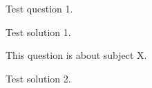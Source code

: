 \documentclass[online]{uob-cs-exam} %
\begin{document}
\maketitle

  \begin{questions}

    \question[10] Test question 1.
    \droppoints


    \begin{solution}
      Test solution 1.
    \end{solution}

    \question[10]
      This question is about subject X.

    \begin{solution}
      Test solution 2.
    \end{solution}

  \end{questions}
\end{document}
